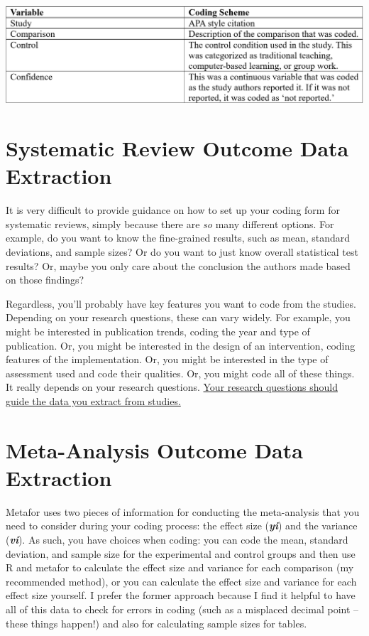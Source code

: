 \documentclass[
]{book}
\begin{document}
\includegraphics[width=1\textwidth,height=\textheight]{images/vartable.PNG}

\hypertarget{systematic-review-outcome-data-extraction}{%
\section{Systematic Review Outcome Data Extraction}\label{systematic-review-outcome-data-extraction}}

It is very difficult to provide guidance on how to set up your coding form for systematic reviews, simply because there are \emph{so} many different options. For example, do you want to know the fine-grained results, such as mean, standard deviations, and sample sizes? Or do you want to just know overall statistical test results? Or, maybe you only care about the conclusion the authors made based on those findings?

Regardless, you'll probably have key features you want to code from the studies. Depending on your research questions, these can vary widely. For example, you might be interested in publication trends, coding the year and type of publication. Or, you might be interested in the design of an intervention, coding features of the implementation. Or, you might be interested in the type of assessment used and code their qualities. Or, you might code all of these things. It really depends on your research questions. \ul{Your research questions should guide the data you extract from studies.}

\hypertarget{meta-analysis-outcome-data-extraction}{%
\section{Meta-Analysis Outcome Data Extraction}\label{meta-analysis-outcome-data-extraction}}

Metafor\citep{viechtbauer2010} uses two pieces of information for conducting the meta-analysis that you need to consider during your coding process: the effect size (\textbf{\emph{yi}}) and the variance (\textbf{\emph{vi}}). As such, you have choices when coding: you can code the mean, standard deviation, and sample size for the experimental and control groups and then use R and metafor to calculate the effect size and variance for each comparison (my recommended method), or you can calculate the effect size and variance for each effect size yourself. I prefer the former approach because I find it helpful to have all of this data to check for errors in coding (such as a misplaced decimal point -- these things happen!) and also for calculating sample sizes for tables.
\end{document}
